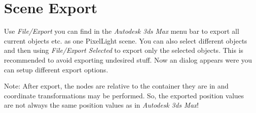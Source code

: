 \chapter{Scene Export}
Use \emph{File/Export} you can find in the \emph{Autodesk 3ds Max} menu bar to export all current objects etc. as one PixelLight scene. You can also select different objects and then using \emph{File/Export Selected} to export only the selected objects. This is recommended to avoid exporting undesired stuff. Now an dialog appears were you can setup different export options.

Note: After export, the nodes are relative to the container they are in and coordinate transformations may be performed. So, the exported position values are not always the same position values as in \emph{Autodesk 3ds Max}!
